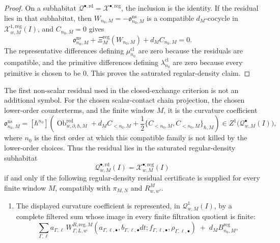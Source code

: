 \begin{proof}
  On a subhabitat
  \(\mathcal Q^{\bullet,\mathrm{rd}}=\mathcal X^{\bullet,\mathrm{reg}}\),
  the inclusion is the identity.  If the residual lies in that subhabitat,
  then
  \(W_{n_0,M}=-\mathfrak o^{\mathrm{ns}}_{n_0,M}\) is a compatible
  \(d_M\)-cocycle in
  \(\mathcal X^{1,\mathrm{reg}}_{w,M}(I)\), and \(C_{n_0,M}=0\) gives
  \[
    \mathfrak o^{\mathrm{ns}}_{n_0,M}
      +\Xi^{\mathrm{reg}}_M(W_{n_0,M})
      +d_MC_{n_0,M}=0.
  \]
  The representative differences defining
  \(\mu^{\mathrm{cl}}_{n_0}\) are zero because the residuals are
  compatible, and the primitive differences defining
  \(\lambda^{\mathrm{cl}}_{n_0}\) are zero because every primitive is
  chosen to be \(0\).  This proves the saturated regular-density claim.
\end{proof}

\begin{prop}
\label{prop:wt-actual-first-residual-regular-density-decision}
  The first non-scalar residual used in the closed-exchange criterion is
  not an additional symbol.  For the chosen scalar-contact chain
  projection, the chosen lower-order counterterms, and the finite window
  \(M\), it is the curvature coefficient
  \[
    \mathfrak o^{\mathrm{ns}}_{n_0,M}
      =
      [\hbar^{n_0}]\left(
        \operatorname{Ob}^{\mathrm{red}}_{w,\partial,\hbar,M}
        +d_MC_{<n_0,M}
        +\frac12\{C_{<n_0,M},C_{<n_0,M}\}_{\hbar,M}
      \right)
      \in Z^1\bigl(\mathcal Q^\bullet_{w,M}(I)\bigr),
  \]
  where \(n_0\) is the first order at which this compatible family is not
  killed by the lower-order choices.  Thus the residual lies in the
  saturated regular-density subhabitat
  \[
    \mathcal Q^{\bullet,\mathrm{rd}}_{w,M}(I)
      =
    \mathcal X^{\bullet,\mathrm{reg}}_{w,M}(I)
  \]
  if and only if the following regular-density residual certificate is
  supplied for every finite window \(M\), compatibly with \(\pi_{M,N}\) and
  \(R^M_{w,w'}\).
  \begin{enumerate}[label=(R\arabic*)]
    \item The displayed curvature coefficient is represented, in
      \(\mathcal Q^1_{w,M}(I)\), by a complete filtered sum whose image in
      every finite filtration quotient is finite:
      \[
        \sum_{\Gamma,\ell}
          a_{\Gamma,\ell}\,
          W^{R,\mathrm{reg},M}_{\Gamma,L,w}
          (a_{\Gamma,\ell,\bullet},
           b_{\Gamma,\ell,\bullet}dt;
           f_{\Gamma,\ell,\bullet},
           \rho_{\Gamma,\ell,\bullet})
        \;+\; d_M B^{\mathrm{reg}}_{n_0,M},
\]
\end{enumerate}
\end{prop}
